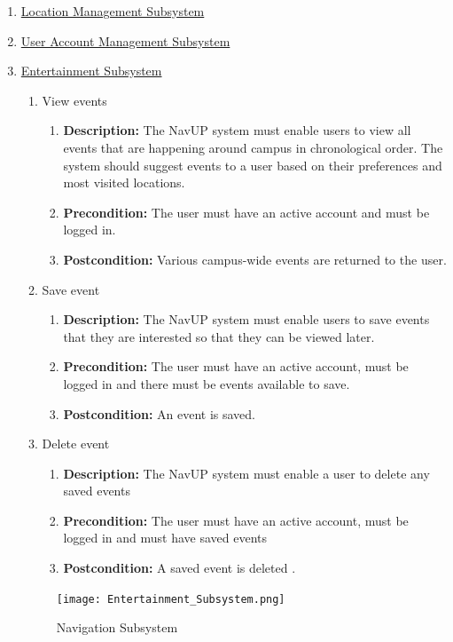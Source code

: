 \documentclass{article}
\begin{document}
\begin{enumerate}
	
	\item \underline{Location Management Subsystem}
	\item \underline{User Account Management Subsystem}
	
	
	\item \underline{Entertainment Subsystem}
			\begin{enumerate}
		\item View events
		\begin{enumerate}
			\item \textbf{Description:} The NavUP system must enable users to view all events that are happening around campus in chronological order. The system should suggest events to a user based on their preferences and most visited locations.
			\item \textbf{Precondition:} The user must have an active account and must be logged in.
			\item \textbf{Postcondition:} Various campus-wide events are returned to the user.\newline
		\end{enumerate}
		
		\item Save event
		\begin{enumerate}
			\item \textbf{Description:} The NavUP system must enable users to save events that they are interested so that they can be viewed later.
			\item \textbf{Precondition:} The user must have an active account, must be logged in and there must be events available to save.
			\item \textbf{Postcondition:} An event is saved.\newline
		\end{enumerate}
		
		\item Delete event
		\begin{enumerate}
			\item \textbf{Description:} The NavUP system must enable a user to delete any saved events
			\item \textbf{Precondition:} The user must have an active account, must be logged in and must have saved events
			\item \textbf{Postcondition:} A saved event is deleted .\newline
		\end{enumerate}
	\end{enumerate}
	\begin{figure}[h!]
		\texttt{[image: Entertainment\_Subsystem.png]}
		\caption{Navigation Subsystem}	
	\end{figure}	
	

\end{enumerate}
\end{document}
